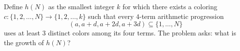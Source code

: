 Define $h(N)$ as the smallest integer $k$ for which there exists a coloring $c:\{1,2,\dots,N\}\to\{1,2,\dots,k\}$ such that every $4$-term arithmetic progression
\[
(a, a+d, a+2d, a+3d)\subseteq\{1,\dots,N\}
\]
uses at least $3$ distinct colors among its four terms.
The problem asks: what is the growth of $h(N)$?
